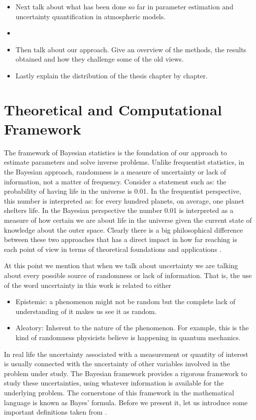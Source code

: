 \documentclass[12pt]{book}
\begin{document}
\begin{itemize}

\newpage
\item Next talk about what has been done so far in parameter estimation and uncertainty quantification
in atmospheric models.
\item 
\item Then talk about our approach. Give an overview of the methods, the results obtained
and how they challenge some of the old views.
\item Lastly explain the distribution of the thesis chapter by chapter.
\end{itemize}
\newpage

\chapter{Theoretical and Computational Framework}


The framework of Bayesian statistics is the foundation of  our approach to estimate parameters and solve 
inverse problems. Unlike frequentist statistics, in the Bayesian approach, randomness
is a measure of uncertainty or lack of information,  not a matter of frequency. Consider a statement such  as:
the probability of having life in the universe is 0.01. In the frequentist
perspective, this number is interpreted as: for every hundred planets, on average, one planet shelters life.
 In the Bayesian
perspective the number 0.01 is interpreted as a measure of how certain we are about life in the universe
given the current state of knowledge about the outer space. 
Clearly there is a big philosophical
difference between these two approaches that has a direct impact in how far reaching is each point of view 
in terms of theoretical foundations and applications  \cite{jaynes2003probability}.


At this point we mention that when we talk about uncertainty we are talking about every possible 
source of randomness  or  lack of information. That is, the use of the word uncertainty in this work
is related to either \cite{kennedy2001bayesian}
\begin{itemize}
\item Epistemic: a phenomenon might not be random but the complete lack of 
understanding of it makes us see it as random.
\item Aleatory: Inherent to the nature of the phenomenon. For 
example, this is the kind of randomness physicists believe is happening in quantum mechanics.
\end{itemize}
In real life the uncertainty associated with a  measurement or  quantity 
of interest is usually connected  with the uncertainty  of other variables involved in the problem under study. 
The Bayesian framework provides a rigorous framework to study these uncertainties, 
using whatever information is available for the underlying problem. The cornerstone of this framework
in the mathematical language is known as   Bayes' formula. Before we present it, let us 
introduce some important definitions taken from \cite{dudley2002real}.
\end{document}
